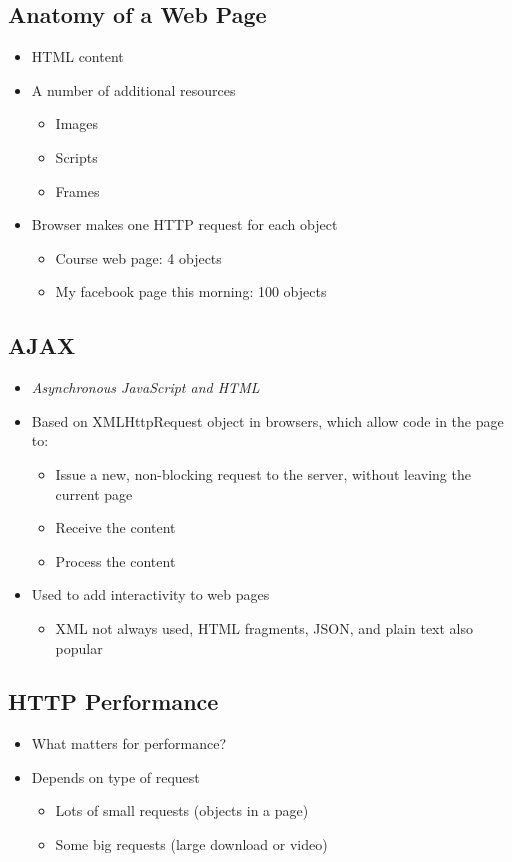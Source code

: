 \subsection{Anatomy of a Web Page}
\begin{itemize}[nosep]
    \item HTML content
    \item A number of additional resources
          \begin{itemize}[nosep]
              \item Images
              \item Scripts
              \item Frames
          \end{itemize}
    \item Browser makes one HTTP request for each object
          \begin{itemize}[nosep]
              \item Course web page: 4 objects
              \item My facebook page this morning: 100 objects
          \end{itemize}
\end{itemize}
\subsection{AJAX}
\begin{itemize}[nosep]
    \item \emph{Asynchronous JavaScript and HTML}
    \item Based on XMLHttpRequest object in browsers, which allow code in the page to:
          \begin{itemize}[nosep]
              \item Issue a new, non-blocking request to the server, without leaving the current page
              \item Receive the content
              \item Process the content
          \end{itemize}
    \item Used to add interactivity to web pages
          \begin{itemize}[nosep]
              \item XML not always used, HTML fragments, JSON, and plain text also popular
          \end{itemize}
\end{itemize}
\subsection{HTTP Performance}
\begin{itemize}[nosep]
    \item What matters for performance?
    \item Depends on type of request
          \begin{itemize}[nosep]
              \item Lots of small requests (objects in a page)
              \item Some big requests (large download or video)
          \end{itemize}
\end{itemize}

